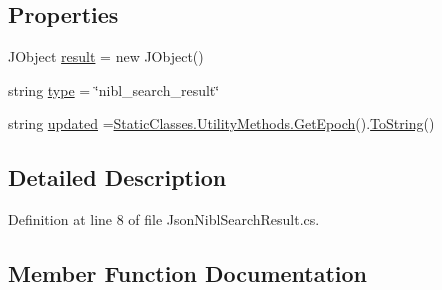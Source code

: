 \subsection*{Properties}
\begin{DoxyCompactItemize}
\item 
J\+Object \mbox{\hyperlink{class_little_weeb_library_1_1_models_1_1_json_nibl_search_result_a73956aafd3d35a51ff43d5a486024138}{result}} = new J\+Object()
\item 
string \mbox{\hyperlink{class_little_weeb_library_1_1_models_1_1_json_nibl_search_result_add369f2f54514df06e35ed94c057f66c}{type}} = \char`\"{}nibl\+\_\+search\+\_\+result\char`\"{}
\item 
string \mbox{\hyperlink{class_little_weeb_library_1_1_models_1_1_json_nibl_search_result_a11c59a1de8aeb3487a38dcd56111c397}{updated}} =\mbox{\hyperlink{class_little_weeb_library_1_1_static_classes_1_1_utility_methods_a12336d9e64983ddabaad8950486fafb2}{Static\+Classes.\+Utility\+Methods.\+Get\+Epoch}}().\mbox{\hyperlink{class_little_weeb_library_1_1_models_1_1_json_nibl_search_result_ad0ccabee81ba5885580d9516f4db4099}{To\+String}}()
\end{DoxyCompactItemize}


\subsection{Detailed Description}


Definition at line 8 of file Json\+Nibl\+Search\+Result.\+cs.



\subsection{Member Function Documentation}
\mbox{\label{class_little_weeb_library_1_1_models_1_1_json_nibl_search_result_a0d6ce8593661ae3dab31882c85b1cff7}} 
